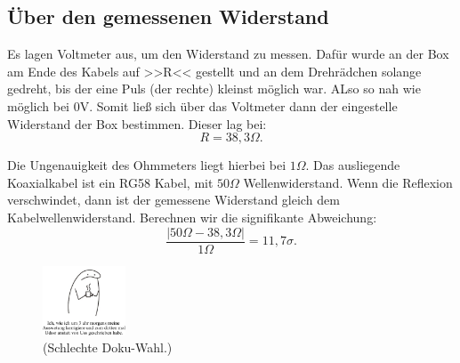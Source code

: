 \subsection*{Über den gemessenen Widerstand}
Es lagen Voltmeter aus, um den Widerstand zu messen. Dafür wurde an der Box am Ende des Kabels auf >>R<< gestellt und an dem Drehrädchen solange gedreht, bis der eine Puls (der rechte) kleinst möglich war. ALso so nah wie möglich bei 0V.
Somit ließ sich über das Voltmeter dann der eingestelle Widerstand der Box bestimmen. Dieser lag bei:
\begin{equation}
    R = 38,3 \Omega.
\end{equation}

Die Ungenauigkeit des Ohmmeters liegt hierbei bei $1\Omega$. Das ausliegende Koaxialkabel ist ein RG58 Kabel, mit $50\Omega$ Wellenwiderstand. 
Wenn die Reflexion verschwindet, dann ist der gemessene Widerstand gleich dem Kabelwellenwiderstand. Berechnen wir die signifikante Abweichung:
\begin{equation}
    \frac{\left| 50 \Omega - 38,3 \Omega  \right|}{1 \Omega} = 11,7\sigma.
\end{equation}

\begin{figure}[h!]
    \centering
    \includegraphics[width=0.22\textwidth]{img/25/memes/Udssr.pdf}
    \caption{(Schlechte Doku-Wahl.)}
\end{figure}